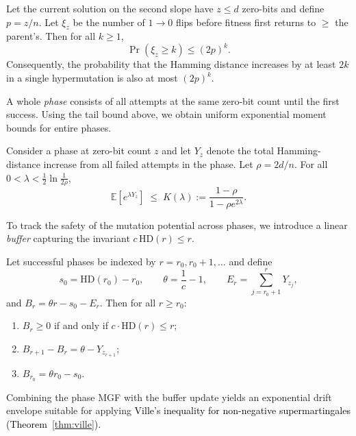 \begin{lemma}%
	 \label{lem:xi-tail}
	Let the current solution on the second slope have $z\le d$ zero-bits and 
	define $p=z/n$.  
	Let $\xi_z$ be the number of $1\to0$ flips before fitness first returns to 
	$\ge$ the parent's.  
	Then for all $k\ge1$,
	\[
	\Pr(\xi_z\ge k)\le (2p)^k.
	\]
	Consequently, the probability that the Hamming distance increases by at least 
	$2k$ in a single hypermutation is also at most $(2p)^k$.
\end{lemma}

A whole \emph{phase} consists of all attempts at the same zero-bit count until the 
first success.  
Using the tail bound above, we obtain uniform exponential moment bounds for 
entire phases.

\begin{lemma}%
	\label{lem:phase-mgf}
	Consider a phase at zero-bit count $z$ and let $Y_z$ denote the total 
	Hamming-distance increase from all failed attempts in the phase.  
	Let $\rho = 2d/n$.  
	For all $0<\lambda<\tfrac12\ln\frac{1}{2\rho}$,
	\[
	\mathbb{E}[e^{\lambda Y_z}] 
	\;\le\; 
	K(\lambda)
	:= 
	\frac{1-\rho}{1-\rho e^{2\lambda}}.
	\]
\end{lemma}

To track the safety of the mutation potential across phases, we introduce a 
linear \emph{buffer}  capturing the invariant $c\,\mathrm{HD}(r)\le r$.

\begin{lemma}%
	\label{lem:buffer}
	Let successful phases be indexed by $r=r_0,r_0+1,\dots$ and define
	\[
	s_0=\mathrm{HD}(r_0)-r_0, \qquad 
	\theta=\frac{1}{c}-1, \qquad
	E_r=\sum_{j=r_0+1}^{r} Y_{z_j},
	\]
	and $B_r = \theta r - s_0 - E_r$.
	Then for all $r\ge r_0$:
	\begin{enumerate}
		\item 
		$B_r\ge0$ if and only if $c\cdot\mathrm{HD}(r)\le r$;
		\item 
		$B_{r+1}-B_r=\theta-Y_{z_{r+1}}$;
		\item 
		$B_{r_0}=\theta r_0 - s_0$.
	\end{enumerate}
\end{lemma}

Combining the phase MGF with the buffer update yields an exponential drift 
envelope suitable for applying \textcolor{black}{Ville's inequality for non-negative supermartingales (Theorem~\ref{thm:ville}).}

